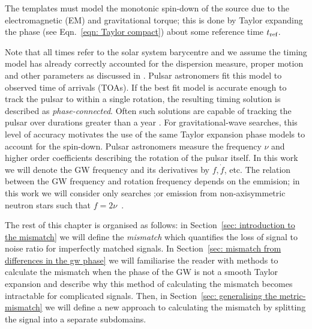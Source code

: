 \documentclass[../full_thesis/full_thesis.tex]{subfiles}
\begin{document}
The templates must model the monotonic spin-down of the source due to the
electromagnetic (EM) and gravitational torque; this is done by Taylor expanding
the phase (see Eqn.~\eqref{eqn: Taylor compact}) about some reference time
$t_{\textrm{ref}}$.

Note that all times refer to the solar system barycentre and we assume the
timing model has already correctly accounted for the dispersion measure, proper
motion and other parameters as discussed in \citet{Edwards2006}.  Pulsar
astronomers fit this model to observed time of arrivals (TOAs). If the best fit
model is accurate enough to track the pulsar to within a single rotation, the
resulting timing solution is described as \emph{phase-connected}.  Often such
solutions are capable of tracking the pulsar over durations greater than  a
year \citep{Lyne2012book}.  For gravitational-wave searches, this level of
accuracy motivates the use of the same Taylor expansion phase models to account
for the spin-down.  Pulsar astronomers measure the frequency $\nu$ and higher
order coefficients describing the rotation of the pulsar itself. In this work
we will denote the GW frequency and its derivatives by $f, \dot{f}$,
etc. The relation between the GW frequency and rotation frequency depends on
the emmision; in this work we will consider only searches ;or emission from
non-axisymmetric neutron stars such that $f=2\nu$~\citep{Shapiro83}.

The rest of this chapter is organised as follows: in Section~\ref{sec:
introduction to the mismatch} we will define the \emph{mismatch} which
quantifies the loss of signal to noise ratio for imperfectly matched signals.
In Section~\ref{sec: mismatch from differences in the gw phase} we will
familiarise the reader with methods to calculate the mismatch when the phase of
the GW is not a smooth Taylor expansion and describe why this method of
calculating the mismatch becomes intractable for complicated signals. Then, in
Section~\ref{sec: generalising the metric-mismatch} we will define a new approach
to calculating the mismatch by splitting the signal into a separate subdomains.
\end{document}
